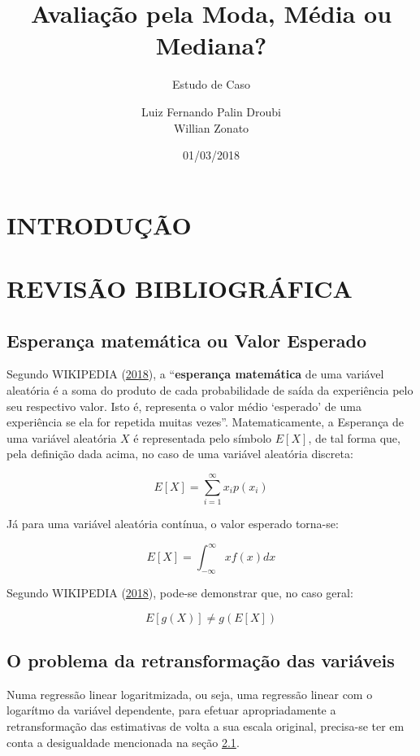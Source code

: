 \documentclass[a4paper]{article}
\title{Avaliação pela Moda, Média ou Mediana?}
\subtitle{Estudo de Caso}
\author{Luiz Fernando Palin Droubi \\ Willian Zonato}
\date{01/03/2018}
\begin{document}
\maketitle

\section{INTRODUÇÃO}\label{introducao}

\section{REVISÃO BIBLIOGRÁFICA}\label{revisao-bibliografica}

\subsection{Esperança matemática ou Valor
Esperado}\label{esperanca-matematica-ou-valor-esperado}

Segundo WIKIPEDIA (\protect\hyperlink{ref-wiki:E}{2018}), a
``\textbf{esperança matemática} de uma variável aleatória é a soma do
produto de cada probabilidade de saída da experiência pelo seu
respectivo valor. Isto é, representa o valor médio `esperado' de uma
experiência se ela for repetida muitas vezes''. Matematicamente, a
Esperança de uma variável aleatória \(X\) é representada pelo símbolo
\(E[X]\), de tal forma que, pela definição dada acima, no caso de uma
variável aleatória discreta:

\[E[X] = \sum_{i = 1}^{\infty}x_ip(x_i)\]

Já para uma variável aleatória contínua, o valor esperado torna-se:

\[E[X] = \int_{-\infty}^{\infty}xf(x)dx\]

Segundo WIKIPEDIA (\protect\hyperlink{ref-wiki:E}{2018}), pode-se
demonstrar que, no caso geral:

\[E[g(X)] \neq g(E[X])\]

\subsection{O problema da retransformação das
variáveis}\label{o-problema-da-retransformacao-das-variaveis}

Numa regressão linear logaritmizada, ou seja, uma regressão linear com o
logarítmo da variável dependente, para efetuar apropriadamente a
retransformação das estimativas de volta a sua escala original,
precisa-se ter em conta a desigualdade mencionada na seção
\ref{esperanca-matematica-ou-valor-esperado}.
\end{document}
